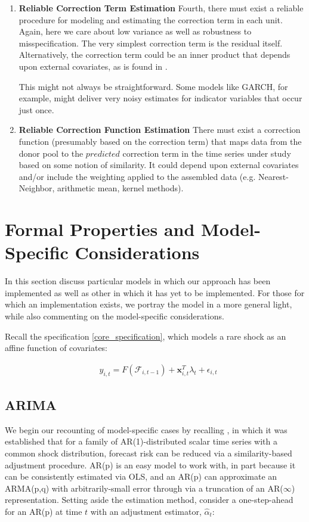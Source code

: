 \documentclass[11pt]{article}
\newcommand{\x}{\textbf{x}}
\theoremstyle{definition}
\begin{document}
\begin{enumerate}
\item \textbf{Reliable Correction Term Estimation} Fourth, there must exist a reliable procedure for modeling and estimating the correction term in each unit.  Again, here we care about low variance as well as robustness to misspecification.  The very simplest correction term is the residual itself.  Alternatively, the correction term could be an inner product that depends upon external covariates, as is found in \cite{lin2021minimizing,lundquist2024volatility}.

This might not always be straightforward.  Some models like GARCH, for example, might deliver very noisy estimates for indicator variables that occur just once.

\item \textbf{Reliable Correction Function Estimation} There must exist a correction function (presumably based on the correction term) that maps data from the donor pool to the $\textit{predicted}$ correction term in the time series under study based on some notion of similarity.  It could depend upon external covariates and/or include the weighting applied to the assembled data (e.g. Nearest-Neighbor, arithmetic mean, kernel methods).

\end{enumerate}

\section{Formal Properties and Model-Specific Considerations}\label{special_cases}

In this section discuss particular models in which our approach has been implemented as well as other in which it has yet to be implemented.  For those for which an implementation exists, we portray the model in a more general light, while also commenting on the model-specific considerations.

Recall the specification \ref{core_specification}, which models a rare shock as an affine function of covariates:

\begin{align*}
  &y_{i,t} = F(\mathcal{F}_{i,t-1}) + \x^{T}_{i,t}\lambda_{t} + \epsilon_{i,t}
\end{align*}

\subsection{ARIMA}
We begin our recounting of model-specific cases by recalling \cite{lin2021minimizing}, in which it was established that for a family of AR(1)-distributed scalar time series with a common shock distribution, forecast risk can be reduced via a similarity-based adjustment procedure.  AR(p) is an easy model to work with, in part because it can be consistently estimated via OLS, and an AR(p) can approximate an ARMA(p,q) with arbitrarily-small error through via a truncation of an AR($\infty$) representation.  Setting aside the estimation method, consider a one-step-ahead for an AR(p) at time $t$ with an adjustment estimator, $\hat\alpha_{t}$:
\end{document}

